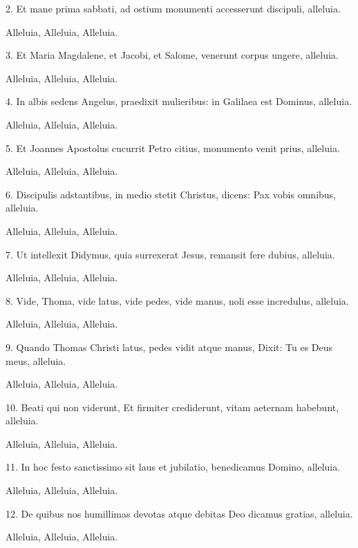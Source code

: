 2. Et mane prima sabbati,
ad ostium monumenti
accesserunt discipuli, alleluia.
 
Alleluia, Alleluia, Alleluia.
 
3. Et Maria Magdalene,
et Jacobi, et Salome,
venerunt corpus ungere, alleluia.
 
Alleluia, Alleluia, Alleluia.
 
4. In albis sedens Angelus,
praedixit mulieribus:
in Galilaea est Dominus, alleluia.
 
Alleluia, Alleluia, Alleluia.
 
5. Et Joannes Apostolus
cucurrit Petro citius,
monumento venit prius, alleluia.
 
Alleluia, Alleluia, Alleluia.
 
6. Discipulis adstantibus,
in medio stetit Christus,
dicens: Pax vobis omnibus, alleluia.
 
Alleluia, Alleluia, Alleluia.
 
7. Ut intellexit Didymus,
quia surrexerat Jesus,
remansit fere dubius, alleluia.
 
Alleluia, Alleluia, Alleluia.
 
8. Vide, Thoma, vide latus,
vide pedes, vide manus,
noli esse incredulus, alleluia.
 
Alleluia, Alleluia, Alleluia.
 
9. Quando Thomas Christi latus,
pedes vidit atque manus,
Dixit: Tu es Deus meus, alleluia.
 
Alleluia, Alleluia, Alleluia.
 
10. Beati qui non viderunt,
Et firmiter crediderunt,
vitam aeternam habebunt, alleluia.
 
Alleluia, Alleluia, Alleluia.
 
11. In hoc festo sanctissimo
sit laus et jubilatio,
benedicamus Domino, alleluia.
 
Alleluia, Alleluia, Alleluia.
 
12. De quibus nos humillimas
devotas atque debitas
Deo dicamus gratias, alleluia.
 
Alleluia, Alleluia, Alleluia.

